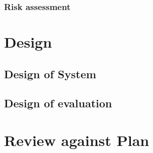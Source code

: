 \documentclass[11pt,times,oneside,openright,hardcopy]{eeereport}
\begin{document}
\subsection{Risk assessment}



\chapter{Design}\label{cpt:des}
\section{Design of System}
\section{Design of evaluation}

\chapter{Review against Plan}






\end{document}
